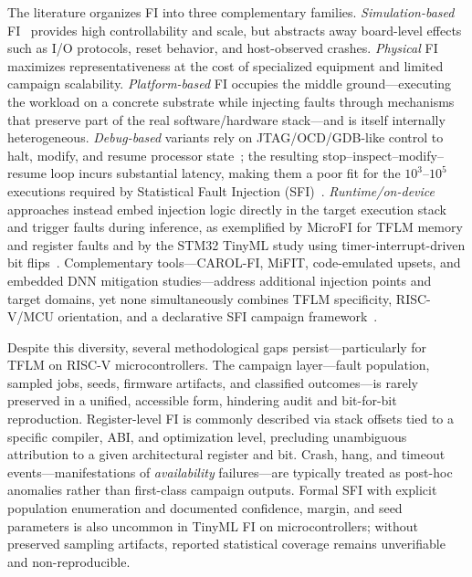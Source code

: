\documentclass[conference]{IEEEtran}
\begin{document}
The literature organizes FI into three complementary families. \emph{Simulation-based} FI~\cite{Mahmoudetal2020,chen2018tensorfi,reagen2018ares,Huang2023MRFI,Zheng2023,agarwal_lltfi_2021,Gogebakan,Ruospo2020Pipelined,Porsia2025On} provides high controllability and scale, but abstracts away board-level effects such as I/O protocols, reset behavior, and host-observed crashes. \emph{Physical} FI~\cite{Trindade2020Assessment,Breier2018Practical,FUKUDA2022Fault,Lee2025Clock} maximizes representativeness at the cost of specialized equipment and limited campaign scalability. \emph{Platform-based} FI occupies the middle ground---executing the workload on a concrete substrate while injecting faults through mechanisms that preserve part of the real software/hardware stack---and is itself internally heterogeneous. \emph{Debug-based} variants rely on JTAG/OCD/GDB-like control to halt, modify, and resume processor state~\cite{article,Magliano2025Real}; the resulting stop--inspect--modify--resume loop incurs substantial latency, making them a poor fit for the $10^{3}$--$10^{5}$ executions required by Statistical Fault Injection (SFI)~\cite{leveugle2009statistical,ruospo2023assessing,ruospo2025iterative,Gavarini2023}. \emph{Runtime/on-device} approaches instead embed injection logic directly in the target execution stack and trigger faults during inference, as exemplified by MicroFI for TFLM memory and register faults and by the STM32 TinyML study using timer-interrupt-driven bit flips~\cite{de2025MicroFI,Karakus2024Soft}. Complementary tools---CAROL-FI, MiFIT, code-emulated upsets, and embedded DNN mitigation studies---address additional injection points and target domains, yet none simultaneously combines TFLM specificity, RISC-V/MCU orientation, and a declarative SFI campaign framework~\cite{Oliveira2017CAROL,Aponte2019MiFIT,Williams2025Evaluating,Abich2021Applying}.


Despite this diversity, several methodological gaps persist---particularly for TFLM on RISC-V microcontrollers. The campaign layer---fault population, sampled jobs, seeds, firmware artifacts, and classified outcomes---is rarely preserved in a unified, accessible form, hindering audit and bit-for-bit reproduction. Register-level FI is commonly described via stack offsets tied to a specific compiler, ABI, and optimization level, precluding unambiguous attribution to a given architectural register and bit. Crash, hang, and timeout events---manifestations of \emph{availability} failures---are typically treated as post-hoc anomalies rather than first-class campaign outputs. Formal SFI with explicit population enumeration and documented confidence, margin, and seed parameters is also uncommon in TinyML FI on microcontrollers; without preserved sampling artifacts, reported statistical coverage remains unverifiable and non-reproducible.
 
\end{document}
